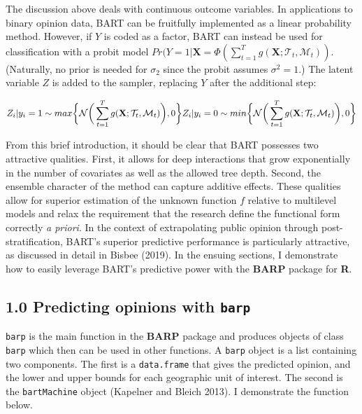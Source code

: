\documentclass[]{article}
\begin{document}
The discussion above deals with continuous outcome variables. In
applications to binary opinion data, BART can be fruitfully implemented
as a linear probability method. However, if \(Y\) is coded as a factor,
BART can instead be used for classification with a probit model
\(Pr(Y = 1|\mathbf{X} = \Phi(\sum_{t = 1}^Tg(\mathbf{X};\mathcal{T}_t,\mathcal{M}_t))\).
(Naturally, no prior is needed for \(\sigma_2\) since the probit assumes
\(\sigma^2 = 1\).) The latent variable \(Z\) is added to the sampler,
replacing \(Y\) after the additional step:

\[Z_i|y_i = 1 \sim max\bigg\{\mathcal{N}\bigg(\sum_{t = 1}^Tg(\mathbf{X};\mathcal{T}_t,\mathcal{M}_t)\bigg),0\bigg\} \\
Z_i|y_i = 0 \sim min\bigg\{\mathcal{N}\bigg(\sum_{t = 1}^Tg(\mathbf{X};\mathcal{T}_t,\mathcal{M}_t)\bigg),0\bigg\}\]

From this brief introduction, it should be clear that BART possesses two
attractive qualities. First, it allows for deep interactions that grow
exponentially in the number of covariates as well as the allowed tree
depth. Second, the ensemble character of the method can capture additive
effects. These qualities allow for superior estimation of the unknown
function \(f\) relative to multilevel models and relax the requirement
that the research define the functional form correctly \emph{a priori}.
In the context of extrapolating public opinion through
post-stratification, BART's superior predictive performance is
particularly attractive, as discussed in detail in Bisbee (2019). In the
ensuing sections, I demonstrate how to easily leverage BART's predictive
power with the \textbf{BARP} package for \textbf{R}.

\subsection{\texorpdfstring{1.0 Predicting opinions with
\texttt{barp}}{1.0 Predicting opinions with barp}}\label{predicting-opinions-with-barp}

\texttt{barp} is the main function in the \textbf{BARP} package and
produces objects of class \texttt{barp} which then can be used in other
functions. A \texttt{barp} object is a list containing two components.
The first is a \texttt{data.frame} that gives the predicted opinion, and
the lower and upper bounds for each geographic unit of interest. The
second is the \texttt{bartMachine} object (Kapelner and Bleich 2013). I
demonstrate the function below.
\end{document}
